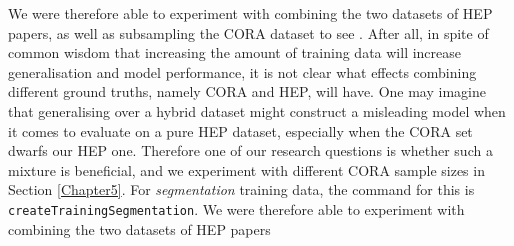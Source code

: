 We were therefore able to experiment with combining the two datasets of HEP papers, as well as subsampling the CORA dataset to see . After all, in spite of common wisdom that increasing the amount of training data will increase generalisation and model performance, it is not clear what effects combining different ground truths, namely CORA and HEP, will have. One may imagine that generalising over a hybrid dataset might construct a misleading model when it comes to evaluate on a pure HEP dataset, especially when the CORA set dwarfs our HEP one. Therefore one of our research questions is whether such a mixture is beneficial, and we experiment with different CORA sample sizes in Section \ref{Chapter5}. For \emph{segmentation} training data, the command for this is \texttt{createTrainingSegmentation}. We were therefore able to experiment with combining the two datasets of HEP papers

